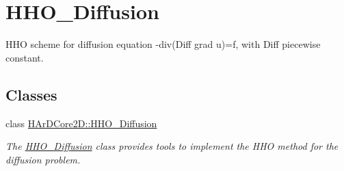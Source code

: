\hypertarget{group__HHO__Diffusion}{}\section{H\+H\+O\+\_\+\+Diffusion}
\label{group__HHO__Diffusion}


H\+HO scheme for diffusion equation -\/div(Diff grad u)=f, with Diff piecewise constant.  


\subsection*{Classes}
\begin{DoxyCompactItemize}
\item 
class \hyperlink{classHArDCore2D_1_1HHO__Diffusion}{H\+Ar\+D\+Core2\+D\+::\+H\+H\+O\+\_\+\+Diffusion}
\begin{DoxyCompactList}\small\item\em The \hyperlink{classHArDCore2D_1_1HHO__Diffusion}{H\+H\+O\+\_\+\+Diffusion} class provides tools to implement the H\+HO method for the diffusion problem. \end{DoxyCompactList}\end{DoxyCompactItemize}
